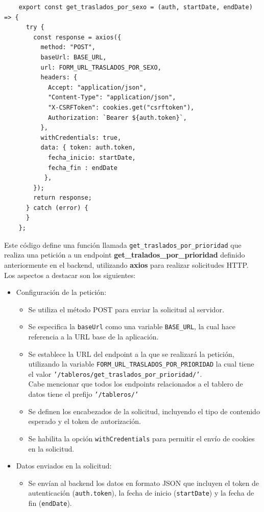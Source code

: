 \begin{enumerate}
    \begin{verbatim}
    export const get_traslados_por_sexo = (auth, startDate, endDate) => {
      try {
        const response = axios({
          method: "POST",
          baseUrl: BASE_URL,
          url: FORM_URL_TRASLADOS_POR_SEXO,
          headers: {
            Accept: "application/json",
            "Content-Type": "application/json",
            "X-CSRFToken": cookies.get("csrftoken"),
            Authorization: `Bearer ${auth.token}`,
          },
          withCredentials: true,
          data: { token: auth.token,
            fecha_inicio: startDate,
            fecha_fin : endDate
           },
        });
        return response; 
      } catch (error) {
      }
    };
    \end{verbatim}
Este código define una función llamada \texttt{get\_traslados\_por\_prioridad} que realiza una petición a un endpoint \textbf{get\_tralados\_por\_prioridad} definido anteriormente en el backend, utilizando \textbf{axios} para realizar solicitudes HTTP. \\
Los aspectos a destacar son los siguientes:
\begin{itemize}
    \item Configuración de la petición:
    \begin{itemize}
        \item Se utiliza el método POST para enviar la solicitud al servidor.
        \item Se especifica la \texttt{baseUrl} como una variable \texttt{BASE\_URL}, la cual hace referencia a la URL base de la aplicación.
        \item Se establece la URL del endpoint a la que se realizará la petición, utilizando la variable \texttt{FORM\_URL\_TRASLADOS\_POR\_PRIORIDAD} la cual tiene el valor \texttt{'/tableros/get\_traslados\_por\_prioridad/'}. \\
        Cabe mencionar que todos los endpoints relacionados a el tablero de datos tiene el prefijo \texttt{'/tableros/'}
        \item Se definen los encabezados de la solicitud, incluyendo el tipo de contenido esperado y el token de autorización.
        \item Se habilita la opción \texttt{withCredentials} para permitir el envío de cookies en la solicitud.
    \end{itemize}
    \item Datos enviados en la solicitud:
    \begin{itemize}
        \item Se envían al backend los datos en formato JSON que incluyen el token de autenticación (\texttt{auth.token}), la fecha de inicio (\texttt{startDate}) y la fecha de fin (\texttt{endDate}).
    \end{itemize}
\end{itemize}


\end{enumerate}
